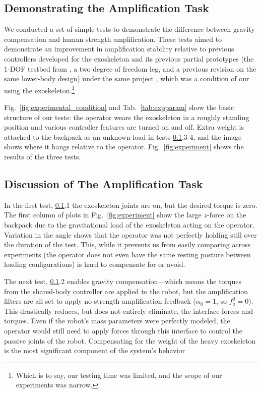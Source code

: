 \subsection{Demonstrating the Amplification Task}\label{subs:amp}
We conducted a set of simple tests to demonstrate the difference between gravity compensation and human strength amplification. These tests aimed to demonstrate an improvement in amplification stability relative to previous controllers developed for the exoskeleton and its previous partial prototypes (the 1-DOF testbed from \cite{HeThomasPaineSentis2019ACC,ThomasCoholichSentis2019AIM}, a two degree of freedom leg, and a previous revision on the same lower-body design) under the same project \cite{Campbell2018Thesis}, which was a condition of our using the exoskeleton.\footnote{Which is to say, our testing time was limited, and the scope of our experiments was narrow.} 

Fig.~\ref{fig:experimental_condition} and Tab.~\ref{tab:expparam} show the basic structure of our tests: the operator wears the exoskeleton in a roughly standing position and various controller features are turned on and off. Extra weight is attached to the backpack as an unknown load in tests \ref{subs:amp}.3-4, and the image shows where it hangs relative to the operator. Fig.~\ref{fig:experiment} shows the results of the three tests. 

 
\subsection{Discussion of The Amplification Task}\label{subs:amp_disc}

In the first test, \ref{subs:amp}.1 the exoskeleton joints are on, but the desired torque is zero. The first column of plots in Fig.~\ref{fig:experiment} show the large $z$-force on the backpack due to the gravitational load of the exoskeleton acting on the operator. Variation in the angle shows that the operator was not perfectly holding still over the duration of the test. This, while it prevents us from easily comparing across experiments (the operator does not even have the same resting posture between loading configurations) is hard to compensate for or avoid.

The next test, \ref{subs:amp}.2 enables gravity compensation---which means the torques from the shared-body controller are applied to the robot, but the amplification filters are all set to apply no strength amplification feedback ($\alpha_0=1$, so $f_a^d=0$). This drastically reduces, but does not entirely eliminate, the interface forces and torques. Even if the robot's mass parameters were perfectly modeled, the operator would still need to apply forces through this interface to control the passive joints of the robot. Compensating for the weight of the heavy exoskeleton is the most significant component of the system's behavior

